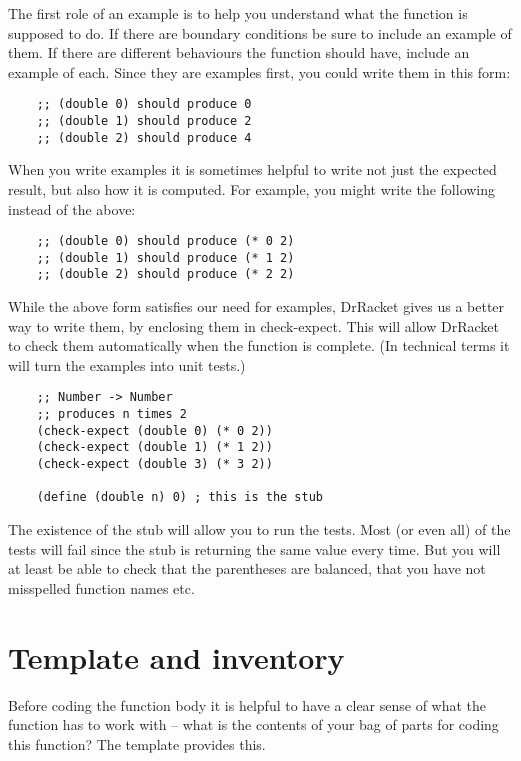 \documentclass[11pt,a4paper]{report}
\begin{document}
	The first role of an example is to help you understand what the function is supposed to do. If
	there are boundary conditions be sure to include an example of them. If there are different
	behaviours the function should have, include an example of each. Since they are examples first,
	you could write them in this form:
	
	\begin{verbatim}
	;; (double 0) should produce 0
	;; (double 1) should produce 2
	;; (double 2) should produce 4
	\end{verbatim}
	
	When you write examples it is sometimes helpful to write not just the expected result, but also
	how it is computed. For example, you might write the following instead of the above:
	
	\begin{verbatim}
	;; (double 0) should produce (* 0 2)
	;; (double 1) should produce (* 1 2)
	;; (double 2) should produce (* 2 2)
	\end{verbatim}
	
	While the above form satisfies our need for examples, DrRacket gives us a better way to write
	them, by enclosing them in check-expect. This will allow DrRacket to check them automatically
	when the function is complete. (In technical terms it will turn the examples into unit tests.)
	
	\begin{verbatim}
	;; Number -> Number
	;; produces n times 2
	(check-expect (double 0) (* 0 2))
	(check-expect (double 1) (* 1 2))
	(check-expect (double 3) (* 3 2))
	
	(define (double n) 0) ; this is the stub
	\end{verbatim}
	
	The existence of the stub will allow you to run the tests. Most (or even all) of the tests will fail
	since the stub is returning the same value every time. But you will at least be able to check that
	the parentheses are balanced, that you have not misspelled function names etc.
	
	\section{Template and inventory}
	Before coding the function body it is helpful to have a clear sense of what the function has to
	work with -- what is the contents of your bag of parts for coding this function? The template
	provides this.
	
\end{document}
